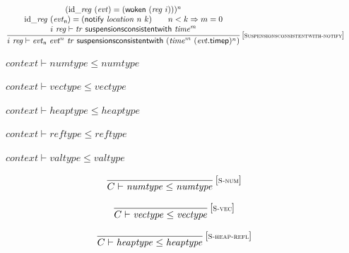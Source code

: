 $$
\begin{array}{@{}c@{}}\displaystyle
\frac{
\begin{array}{@{}c@{}}
({{\mathrm{id}}}{\mathsf{\_}}{{\mathit{reg}}}~({\mathit{evt}}) = (\mathsf{woken}~({\mathit{reg}}~i)))^{n}
 \\
{{\mathrm{id}}}{\mathsf{\_}}{{\mathit{reg}}}~({\mathit{evt}}_{\mathsf{n}}) = (\mathsf{notify}~{\mathit{location}}~n~k)
 \qquad
n < k \Rightarrow m = 0
 \\
i~{\mathit{reg}} \vdash {\mathit{tr}}~\mathsf{suspensionsconsistentwith}~{{\mathit{time}}^{m}}
\end{array}
}{
i~{\mathit{reg}} \vdash {\mathit{evt}}_{\mathsf{n}}~{{\mathit{evt}}^{n}}~{\mathit{tr}}~\mathsf{suspensionsconsistentwith}~({{\mathit{time}}^{m}}~{({\mathit{evt}}{.}\mathsf{timep})^{n}})
} \, {[\textsc{\scriptsize Suspensionsconsistentwith{-}notify}]}
\qquad
\end{array}
$$

\vspace{1ex}

$\boxed{{\mathit{context}} \vdash {\mathit{numtype}} \leq {\mathit{numtype}}}$

$\boxed{{\mathit{context}} \vdash {\mathit{vectype}} \leq {\mathit{vectype}}}$

$\boxed{{\mathit{context}} \vdash {\mathit{heaptype}} \leq {\mathit{heaptype}}}$

$\boxed{{\mathit{context}} \vdash {\mathit{reftype}} \leq {\mathit{reftype}}}$

$\boxed{{\mathit{context}} \vdash {\mathit{valtype}} \leq {\mathit{valtype}}}$

$$
\begin{array}{@{}c@{}}\displaystyle
\frac{
}{
C \vdash {\mathit{numtype}} \leq {\mathit{numtype}}
} \, {[\textsc{\scriptsize S{-}num}]}
\qquad
\end{array}
$$

$$
\begin{array}{@{}c@{}}\displaystyle
\frac{
}{
C \vdash {\mathit{vectype}} \leq {\mathit{vectype}}
} \, {[\textsc{\scriptsize S{-}vec}]}
\qquad
\end{array}
$$

\vspace{1ex}

$$
\begin{array}{@{}c@{}}\displaystyle
\frac{
}{
C \vdash {\mathit{heaptype}} \leq {\mathit{heaptype}}
} \, {[\textsc{\scriptsize S{-}heap{-}refl}]}
\qquad
\end{array}
$$

